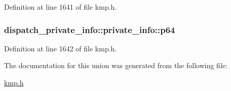 Definition at line 1641 of file kmp.\-h.

\hypertarget{uniondispatch__private__info_1_1private__info_a0d430fe4aad2d5875d4c9480a2ec984f}{
\subsubsection[{p64}]{ dispatch\-\_\-private\-\_\-info\-::private\-\_\-info\-::p64}}\label{uniondispatch__private__info_1_1private__info_a0d430fe4aad2d5875d4c9480a2ec984f}


Definition at line 1642 of file kmp.\-h.



The documentation for this union was generated from the following file\-:\begin{DoxyCompactItemize}
\item 
\hyperlink{kmp_8h}{kmp.\-h}\end{DoxyCompactItemize}
